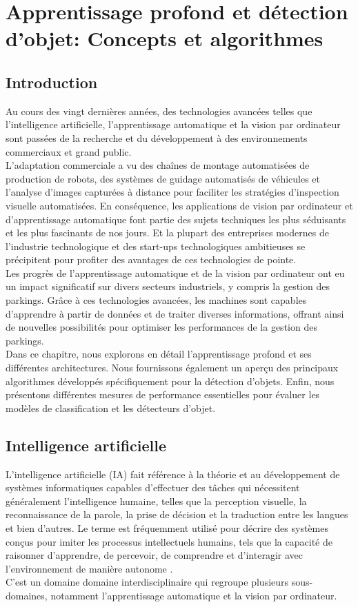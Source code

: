 \chapter{Apprentissage profond et détection d'objet: Concepts et algorithmes}
\section{Introduction}
Au cours des vingt dernières années, des technologies avancées telles que l'intelligence artificielle, l'apprentissage automatique et la vision par ordinateur sont passées de la recherche et du développement à des environnements commerciaux et grand public.
\\
L'adaptation commerciale a vu des chaînes de montage automatisées de production de robots, des systèmes de guidage automatisés de véhicules et l'analyse d'images capturées à distance pour faciliter les stratégies d'inspection visuelle automatisées. En conséquence, les applications de vision par ordinateur et d'apprentissage automatique font partie des sujets techniques les plus séduisants et les plus fascinants de nos jours. Et la plupart des entreprises modernes de l'industrie technologique et des start-ups technologiques ambitieuses se précipitent pour profiter des avantages de ces technologies de pointe.
\\
Les progrès de l'apprentissage automatique et de la vision par ordinateur ont eu un impact significatif sur divers secteurs industriels, y compris la gestion des parkings. Grâce à ces technologies avancées, les machines sont capables d'apprendre à partir de données et de traiter diverses informations, offrant ainsi de nouvelles possibilités pour optimiser les performances de la gestion des parkings.
\\
Dans ce chapitre, nous explorons en détail l'apprentissage profond et ses différentes architectures. Nous fournissons également un aperçu des principaux algorithmes développés spécifiquement pour la détection d'objets. Enfin, nous présentons différentes mesures de performance essentielles pour évaluer les modèles de classification et les détecteurs d'objet.

\section{Intelligence artificielle }
L'intelligence artificielle (IA) fait référence à la théorie et au développement de systèmes informatiques capables d'effectuer des tâches qui nécessitent généralement l'intelligence humaine, telles que la perception visuelle, la reconnaissance de la parole, la prise de décision et la traduction entre les langues et bien d'autres. Le terme est fréquemment utilisé pour décrire des systèmes conçus pour imiter les processus intellectuels humains, tels que la capacité de raisonner d'apprendre, de percevoir, de comprendre et d'interagir avec l'environnement de manière autonome \cite{Questceq75}.
\\
C'est un domaine domaine interdisciplinaire  qui regroupe plusieurs sous-domaines, notamment l'apprentissage automatique et la vision par ordinateur.

